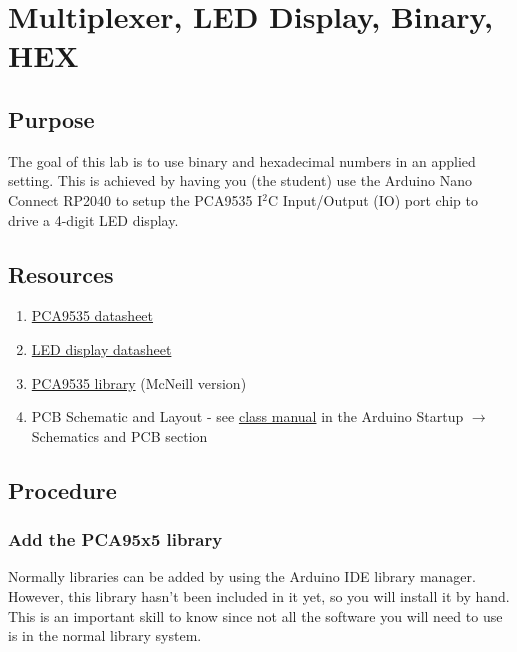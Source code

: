 \chapter{Multiplexer, LED Display, Binary, HEX}

\section{Purpose}
The goal of this lab is to use binary and hexadecimal numbers in an applied setting. This is 
achieved by having you (the student) use the Arduino Nano Connect RP2040 to setup the 
PCA9535 I$^2$C Input/Output (IO) port chip to drive a 4-digit LED display.

\section{Resources}\label{sec:resources}
\begin{enumerate}
    \item \href{https://www.nxp.com/docs/en/data-sheet/PCA9535_PCA9535C.pdf}{PCA9535 datasheet}
    \item \href{https://datasheet.lcsc.com/lcsc/1810191633_SUNLIGHT-SLR0394FG3C5BD-3-5_C225905.pdf}{LED display datasheet}
    \item \href{https://github.com/semcneil/PCA95x5}{PCA9535 library} (McNeill version)
    \item PCB Schematic and Layout - see 
            \href{https://github.com/semcneil/Fundamentals-of-Microcontrollers-Manual}{class manual} 
            in the Arduino Startup $\rightarrow$ Schematics and PCB section
\end{enumerate}

\section{Procedure}
\subsection{Add the PCA95x5 library}
Normally libraries can be added by using the Arduino IDE library manager. However, this 
library hasn't been included in it yet, so you will install it by hand. This is an 
important skill to know since not all the software you will need to use is in the 
normal library system.

